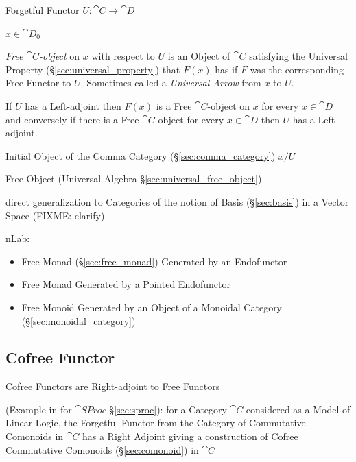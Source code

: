 Forgetful Functor $U : \cat{C} \rightarrow \cat{D}$

$x \in \cat{D}_0$

\emph{Free $\cat{C}$-object} on $x$ with respect to $U$ is an Object
of $\cat{C}$ satisfying the Universal Property
(\S\ref{sec:universal_property}) that $F(x)$ has if $F$ was the
corresponding Free Functor to $U$. Sometimes called a \emph{Universal
  Arrow} from $x$ to $U$.

If $U$ has a Left-adjoint then $F(x)$ is a Free $\cat{C}$-object on
$x$ for every $x \in \cat{D}$ and conversely if there is a Free
$\cat{C}$-object for every $x \in \cat{D}$ then $U$ has a
Left-adjoint.

Initial Object of the Comma Category (\S\ref{sec:comma_category}) $x /
U$

\fist Free Object (Universal Algebra \S\ref{sec:universal_free_object})

direct generalization to Categories of the notion of Basis (\S\ref{sec:basis})
in a Vector Space (FIXME: clarify)

nLab:

\begin{itemize}
  \item Free Monad (\S\ref{sec:free_monad}) Generated by an Endofunctor
  \item Free Monad Generated by a Pointed Endofunctor
  \item Free Monoid Generated by an Object of a Monoidal Category
    (\S\ref{sec:monoidal_category})
\end{itemize}



\subsection{Cofree Functor}\label{sec:cofree_functor}

Cofree Functors are Right-adjoint to Free Functors

(Example in \cite{abramsky-gay-nagarajan96} for $\cat{SProc}$
\S\ref{sec:sproc}): for a Category $\cat{C}$ considered as a Model of
Linear Logic, the Forgetful Functor from the Category of Commutative
Comonoids in $\cat{C}$ has a Right Adjoint giving a construction of
Cofree Commutative Comonoids (\S\ref{sec:comonoid}) in $\cat{C}$




